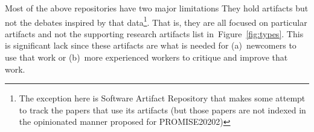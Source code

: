 \documentclass[journal]{IEEEtran}
\newcommand{\fig}[1]{Figure~\ref{fig:#1}}
\begin{document}
Most of the above repositories have two major limitations
They hold artifacts  but not
the debates inspired by that data\footnote{The exception here is Software Artifact Repository  that makes
some attempt to track the papers that use its artifacts (but those papers are not indexed
in the opinionated manner proposed for PROMISE20202)}.
That is,
they are all  focused on particular artifacts and not the supporting research artifacts list in~\fig{types}.
This is significant lack since these artifacts are what is needed
for (a)~newcomers to use that work or (b)~more experienced workers to critique and improve that work.




 

%
%



%
%
\end{document}
